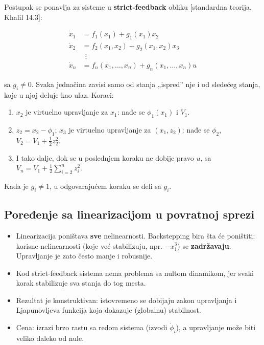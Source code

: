 \documentclass[11pt,a4paper,parskip=half,headsepline,numbers=noenddot]{scrartcl}
\DeclareRobustCommand{\izvor}[1]{{\small\color{izvorC}[#1]}}
\begin{document}
Postupak se ponavlja za sisteme u \textbf{strict-feedback} obliku \izvor{standardna teorija, Khalil 14.3}:

\[
\begin{aligned}
\dot x_1 &= f_1(x_1) + g_1(x_1)x_2 \\
\dot x_2 &= f_2(x_1, x_2) + g_2(x_1, x_2)x_3 \\
&\ \ \vdots \\
\dot x_n &= f_n(x_1, \dots, x_n) + g_n(x_1, \dots, x_n)u
\end{aligned}
\]

sa \(g_i \ne 0\). Svaka jednačina zavisi samo od stanja „ispred'' nje i od sledećeg stanja, koje u njoj deluje kao ulaz. Koraci:

\begin{enumerate}
\def\labelenumi{\arabic{enumi}.}
\item \(x_2\) je virtuelno upravljanje za \(x_1\): nađe se \(\phi_1(x_1)\) i \(V_1\).
\item \(z_2 = x_2 - \phi_1\); \(x_3\) je virtuelno upravljanje za \((x_1, z_2)\): nađe se \(\phi_2\), \(V_2 = V_1 + \frac12z_2^2\).
\item I tako dalje, dok se u poslednjem koraku ne dobije pravo \(u\), sa \(V_n = V_1 + \frac12\sum_{i=2}^n z_i^2\).
\end{enumerate}

Kada je \(g_i \ne 1\), u odgovarajućem koraku se deli sa \(g_i\).

\subsection{Poređenje sa linearizacijom u povratnoj sprezi}

\begin{itemize}
\item Linearizacija poništava \textbf{sve} nelinearnosti. Backstepping bira šta će poništiti: korisne nelinearnosti (koje već stabilizuju, npr. \(-x_1^3\)) se \textbf{zadržavaju}. Upravljanje je zato često manje i robusnije.
\item Kod strict-feedback sistema nema problema sa nultom dinamikom, jer svaki korak stabilizuje sva stanja do tog mesta.
\item Rezultat je konstruktivan: istovremeno se dobijaju zakon upravljanja i Ljapunovljeva funkcija koja dokazuje (globalnu) stabilnost.
\item Cena: izrazi brzo rastu sa redom sistema (izvodi \(\dot\phi_i\)), a upravljanje može biti veliko daleko od nule.
\end{itemize}
\end{document}
